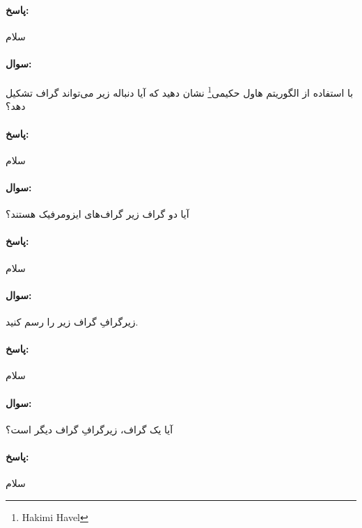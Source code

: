 \documentclass[a4paper,10pt]{article}
\begin{document}
    \paragraph{پاسخ:} سلام

    \noindent\hrulefill

    \paragraph{سوال:} با استفاده از الگوریتم هاول حکیمی\footnote{\hspace{2pt}Hakimi Havel} نشان دهید که آیا دنباله‌ زیر می‌تواند گراف تشکیل دهد؟

    \paragraph{پاسخ:} سلام

    \noindent\hrulefill

    \paragraph{سوال:} آیا دو گراف زیر گراف‌های ایزومرفیک هستند؟

    \paragraph{پاسخ:} سلام

    \noindent\hrulefill

    \paragraph{سوال:} زیرگرافِ گراف زیر را رسم کنید.

    \paragraph{پاسخ:} سلام

    \noindent\hrulefill

    \paragraph{سوال:} آیا یک گراف، زیرگرافِ گراف دیگر است؟
 
    \paragraph{پاسخ:} سلام
\end{document}
